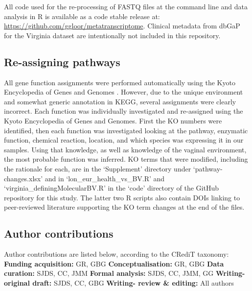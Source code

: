 \documentclass[sn-mathphys,Numbered]{sn-jnl}%
\begin{document}
All code used for the re-processing of FASTQ files at the command line and data analysis in R is available as a code stable release at: \url{https://github.com/ggloor/metatranscriptome}. Clinical metadata from dbGaP for the Virginia dataset are intentionally not included in this repository.

\subsection{Re-assigning pathways}\label{subsec:subsecPathways}
All gene function assignments were performed automatically using the Kyoto Encyclopedia of Genes and Genomes \cite{Kanehisa:2010}. However, due to the unique environment and somewhat generic annotation in KEGG, several assignments were clearly incorrect. Each function was individually investigated and re-assigned using the Kyoto Encyclopedia of Genes and Genomes. First the KO numbers were identified, then each function was investigated looking at the pathway, enzymatic function, chemical reaction, location, and which species was expressing it in our samples. Using that knowledge, as well as knowledge of the vaginal environment, the most probable function was inferred. KO terms that were modified, including the rationale for each, are in the `Supplement' directory under `pathway-changes.xlsx' and in `lon\_eur\_health\_vs\_BV.R' and `virginia\_definingMolecularBV.R' in the `code' directory of the GitHub repository for this study. The latter two R scripts also contain DOIs linking to peer-reviewed literature supporting the KO term changes at the end of the files.

\subsection{Author contributions}\label{subsec:subsecContribs}
Author contributions are listed below, according to the CRediT taxonomy:
\\
\newline
\textbf{Funding acquisition:} GR, GBG\newline
\textbf{Conceptualisation:} GR, GBG\newline
\textbf{Data curation:} SJDS, CC, JMM\newline
\textbf{Formal analysis:} SJDS, CC, JMM, GG\newline
\textbf{Writing- original draft:} SJDS, CC, GBG\newline
\textbf{Writing- review \& editing:} All authors
\newpage
\end{document}
